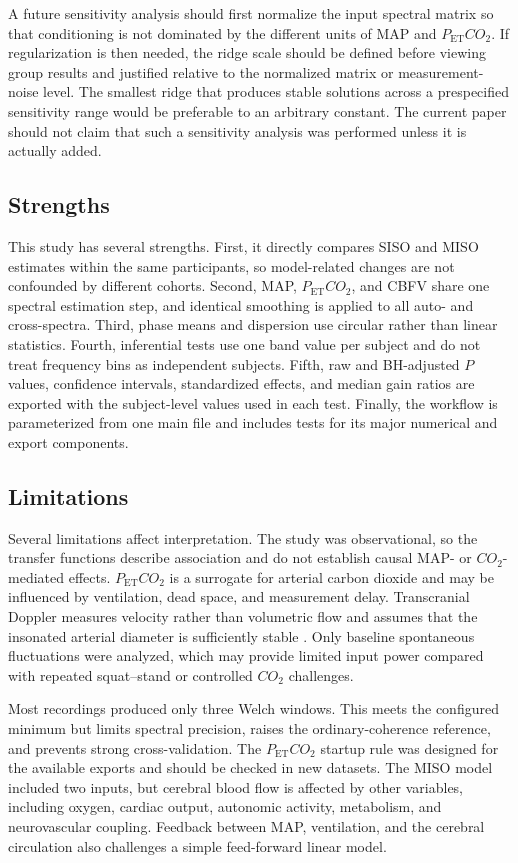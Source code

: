 \documentclass[12pt]{article}
\newcommand{\PETCOtwo}{P_{\mathrm{ET}}CO_2}
\newcommand{\COtwo}{CO_2}
\begin{document}
A future sensitivity analysis should first normalize the input spectral
matrix so that conditioning is not dominated by the different units of MAP
and $\PETCOtwo$. If regularization is then needed, the ridge scale should be
defined before viewing group results and justified relative to the normalized
matrix or measurement-noise level. The smallest ridge that produces stable
solutions across a prespecified sensitivity range would be preferable to an
arbitrary constant. The current paper should not claim that such a sensitivity
analysis was performed unless it is actually added.

\subsection{Strengths}

This study has several strengths. First, it directly compares SISO and MISO
estimates within the same participants, so model-related changes are not
confounded by different cohorts. Second, MAP, $\PETCOtwo$, and CBFV share one
spectral estimation step, and identical smoothing is applied to all auto- and
cross-spectra. Third, phase means and dispersion use circular rather than
linear statistics. Fourth, inferential tests use one band value per subject
and do not treat frequency bins as independent subjects. Fifth, raw and
BH-adjusted $P$ values, confidence intervals, standardized effects, and median
gain ratios are exported with the subject-level values used in each test.
Finally, the workflow is parameterized from one main file and includes tests
for its major numerical and export components.

\subsection{Limitations}

Several limitations affect interpretation. The study was observational, so
the transfer functions describe association and do not establish causal MAP-
or $\COtwo$-mediated effects. $\PETCOtwo$ is a surrogate for arterial carbon
dioxide and may be influenced by ventilation, dead space, and measurement
delay. Transcranial Doppler measures velocity rather than volumetric flow and
assumes that the insonated arterial diameter is sufficiently stable
\cite{Aaslid1982}. Only baseline spontaneous fluctuations were analyzed, which
may provide limited input power compared with repeated squat--stand or
controlled $\COtwo$ challenges.

Most recordings produced only three Welch windows. This meets the configured
minimum but limits spectral precision, raises the ordinary-coherence reference,
and prevents strong cross-validation. The $\PETCOtwo$ startup rule was designed
for the available exports and should be checked in new datasets. The MISO
model included two inputs, but cerebral blood flow is affected by other
variables, including oxygen, cardiac output, autonomic activity, metabolism,
and neurovascular coupling. Feedback between MAP, ventilation, and the
cerebral circulation also challenges a simple feed-forward linear model.
\end{document}
